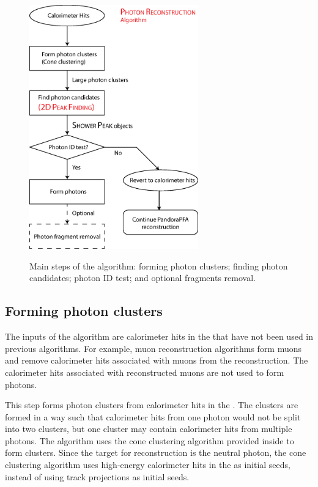 \begin{figure}[tbph]
\centering
{\includegraphics[width=0.65\textwidth]{photon/photonRecoFlow2}}
\caption[A flow diagram of the \PhotonReconstruction algorithm.]
{Main steps of the \PhotonReconstruction algorithm: forming photon clusters; finding photon candidates; photon ID test; and optional fragments removal.}
\label{fig:photonPhotonRecoFlow}
\end{figure}


\subsection{Forming photon clusters}

The inputs of the \PhotonReconstruction algorithm are calorimeter hits in the \ECAL that have not been used in previous algorithms. For example, muon reconstruction algorithms form muons and remove calorimeter hits associated with muons from the reconstruction. The  calorimeter hits associated with reconstructed muons are not used to form photons.

This step forms photon clusters from calorimeter hits in the \ECAL. The clusters are formed in a way such that calorimeter hits from one photon would not be split into two clusters, but one cluster may contain calorimeter hits from  multiple photons. The algorithm uses  the cone clustering algorithm  provided inside \pandora to form clusters.  Since the target for reconstruction is the neutral photon, the cone clustering algorithm uses high-energy calorimeter hits in the \ECAL as initial seeds, instead of using track projections as initial seeds.  %

